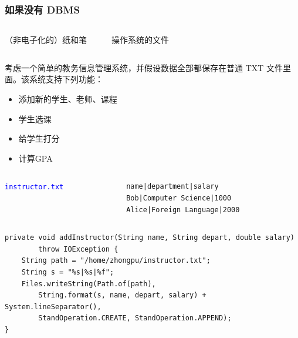 \documentclass[aspectratio=169, 14pt]{beamer}
\begin{document}
\begin{frame}
	\frametitle{如果没有 DBMS}

	\begin{columns}
		{\Large {}}  {\huge {}}

		（非电子化的）纸和笔

		{\LARGE {}      }

		操作系统的文件
	\end{columns}
\end{frame}
\begin{frame}
	考虑一个简单的\alert{教务信息管理系统}，并假设数据全部都保存在普通 TXT 文件里面。该系统支持下列功能：
	\begin{itemize}
		\item 添加新的学生、老师、课程
		\item 学生选课
		\item 给学生打分
		\item 计算GPA
	\end{itemize}
\end{frame}

\begin{frame}[fragile]

	\begin{columns}
		\column{0.2\textwidth}
		{\large \textcolor{blue}{\texttt{instructor.txt}}}
		\column{0.7\textwidth}
		\begin{verbatim}
            name|department|salary
            Bob|Computer Science|1000
            Alice|Foreign Language|2000        
         \end{verbatim}
	\end{columns}
	\pause
	\begin{verbatim}
private void addInstructor(String name, String depart, double salary)    
        throw IOException {
    String path = "/home/zhongpu/instructor.txt";
    String s = "%s|%s|%f";
    Files.writeString(Path.of(path),
        String.format(s, name, depart, salary) + System.lineSeparator(),
        StandOperation.CREATE, StandOperation.APPEND); 
}
    \end{verbatim}

\end{frame}
\end{document}
